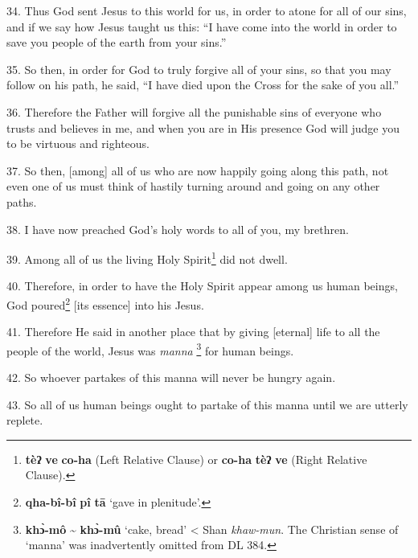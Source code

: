 34. Thus God sent Jesus to this world for us, in order to atone for all of our
sins, and if we say how Jesus taught us this: ``I have come into the world in order
to save you people of the earth from your sins.''

35. So then, in order for God to truly forgive all of your sins, so that you may
follow on his path, he said, ``I have died upon the Cross for the sake of you all.''

36. Therefore the Father will forgive all the punishable sins of everyone who trusts
and believes in me, and when you are in His presence God will judge you to be virtuous
and righteous.

37. So then, [among] all of us who are now happily going along this path, not even
one of us must think of hastily turning around and going on any other paths.

38. I have now preached God's holy words to all of you, my brethren.

39. Among all of us the living Holy Spirit\footnote{\textbf{tèʔ} \textbf{ve} \textbf{co-ha} (Left Relative Clause) or \textbf{co-ha} \textbf{tèʔ} \textbf{ve} (Right Relative Clause).} did not dwell.

40. Therefore, in order to have the Holy Spirit appear among us human beings, God
poured\footnote{\textbf{qha-bî-bî} \textbf{pî} \textbf{tā} `gave in plenitude'.} [its essence] into his Jesus.

41. Therefore He said in another place that by giving [eternal] life to all the
people of the world, Jesus was \textit{manna }\footnote{\textbf{khɔ̀-mô} \textasciitilde{ \textbf{khɔ̀-mû} }`cake, bread' < Shan \textit{khaw-mun}. The Christian sense of `manna' was inadvertently omitted from DL 384.} for human beings.

42. So whoever partakes of this manna will never be hungry again.

43. So all of us human beings ought to partake of this manna until we are utterly replete.

